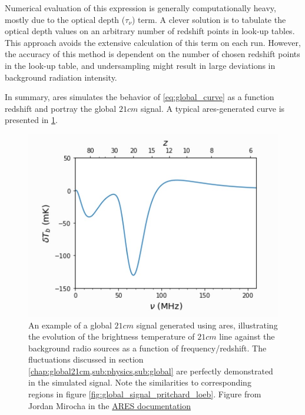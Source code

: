 \documentclass[12pt, TexShade, letterpaper]{report}
\begin{document}
Numerical evaluation of this expression is generally computationally heavy, mostly due to the optical depth ($\tau_\nu$) term. A clever solution is to tabulate the optical depth values on an arbitrary number of redshift points in look-up tables. This approach avoids the extensive calculation of this term on each run. However, the accuracy of this method is dependent on the number of chosen redshift points in the look-up table, and undersampling might result in large deviations in background radiation intensity.\par
In summary, \gls{ares} simulates the behavior of \ref{eq:global_curve} as a function redshift and portray the global $21cm$ signal. A typical \gls{ares}-generated curve is presented in \ref{fig:ares_Curve}. \par
\begin{figure}[h!]
    \centering
    \includegraphics[scale =0.8]{ares_curve.jpg}
    \caption[Typical global $21cm$ curve generated using \gls{ares}]{An example of a global $21cm$ signal generated using \gls{ares}, illustrating the evolution of the brightness temperature of $21cm$ line against the background radio sources as a function of frequency/redshift. The fluctuations discussed in section \ref{chap:global21cm,sub:physics,sub:global} are perfectly demonstrated in the simulated signal. Note the similarities to corresponding regions in figure \ref{fig:global_signal_pritchard_loeb}. Figure from Jordan Mirocha in the \hyperlink{https://ares.readthedocs.io/en/latest/examples/example_gs_standard.html}{ARES documentation}}
    \label{fig:ares_Curve}
\end{figure}
\end{document}
